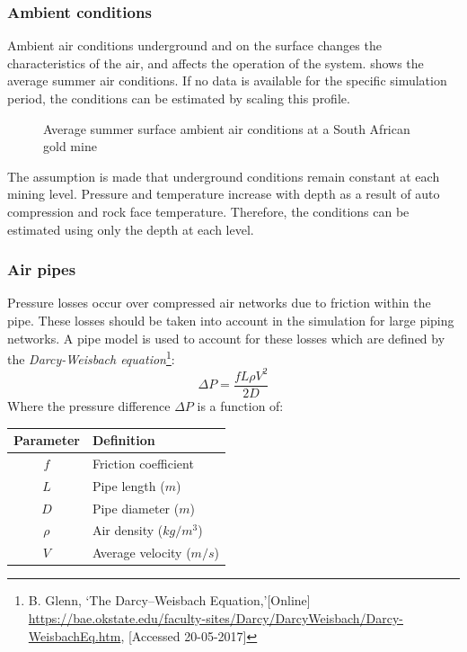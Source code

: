 		\subsubsection{Ambient conditions}
		Ambient air conditions underground and on the surface changes the characteristics of the air, and affects the operation of the system.  shows the average summer air conditions. If no data is available for the specific simulation period, the conditions can be estimated by scaling this profile.
		\begin{figure}[h!]
			\centering
			\fbox{}
			\caption{Average summer surface ambient air conditions at a South African gold mine}
			\label{fig: Ambient}
		\end{figure}
		\par
		The assumption is made that underground conditions remain constant at each mining level. Pressure and temperature increase with depth as a result of auto compression and rock face temperature. Therefore, the conditions can be estimated using only the depth at each level.
		\subsubsection{Air pipes}
		Pressure losses occur over compressed air networks due to friction within the pipe. These losses should be taken into account in the simulation for large piping networks. A pipe model is used to account for these losses which are defined by the \textit{Darcy-Weisbach equation}\footnote{ B. Glenn, \enquote*{The Darcy–Weisbach Equation,}[Online] \url{https://bae.okstate.edu/faculty-sites/Darcy/DarcyWeisbach/Darcy-WeisbachEq.htm}, [Accessed 20-05-2017]}:
		$$\Delta P = \frac{f L \rho V^2}{2 D}$$
		Where the pressure difference $\Delta P $ is a function of:
		\begin{table}[h!]
			\centering
			\begin{tabular}{cl}
				\hline
				Parameter & Definition\\
				\hline
				$f$ & Friction coefficient \\
				$L$ & Pipe length ($m$) \\
				$D$ & Pipe diameter ($m$) \\
				$\rho$ & Air density ($kg/m^3$)\\	
				$V$ & Average velocity ($m/s$) \\	
				\hline
			\end{tabular} 
			\label{table: Darcy-Weisbach}
		\end{table}
		
